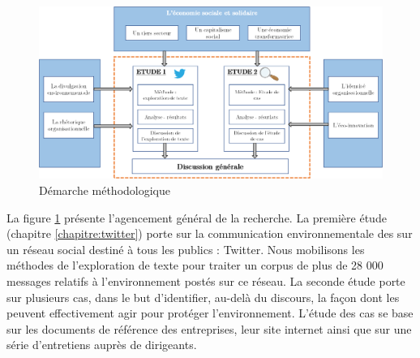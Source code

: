 \begin{landscape}
    \begin{figure}
        \centering
        \caption{Démarche méthodologique}
        \label{fig:methodoglobale}
        \includegraphics[width=\linewidth]{fig/methodo.png}
    \end{figure}
\end{landscape}

	La figure \ref{fig:methodoglobale} présente l'agencement général de la recherche. La première étude (chapitre \ref{chapitre:twitter}) porte sur la communication environnementale des \eess sur un réseau social destiné à tous les publics : Twitter. Nous mobilisons les méthodes de l’exploration de texte pour traiter un corpus de plus de 28 000 messages relatifs à l’environnement postés sur ce réseau. La seconde étude porte sur plusieurs cas, dans le but d'identifier, au-delà du discours, la façon dont les \eess peuvent effectivement agir pour protéger l’environnement. L’étude des cas se base sur les documents de référence des entreprises, leur site internet ainsi que sur une série d’entretiens auprès de dirigeants. \\
